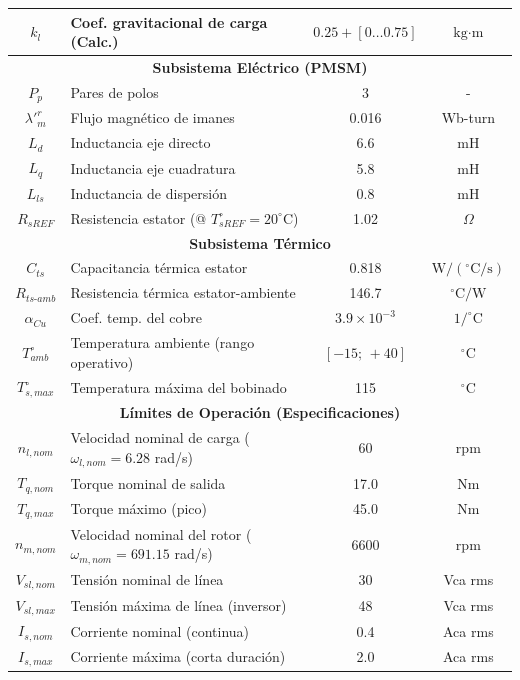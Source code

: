 \documentclass[12pt, a4paper,journal, onecolumn, compsoc]{IEEEtran}
\begin{document}
\begin{table}[htbp]
\begin{tabular}{|c|l|c|c|}
        $k_l$ & Coef. gravitacional de carga (Calc.) & $0.25 + [0\ldots0.75]$ & $\text{kg}\cdot\text{m}$ \\
        \hline
        \multicolumn{4}{|c|}{\textbf{Subsistema Eléctrico (PMSM)}} \\
        \hline
        $P_p$ & Pares de polos & 3 & - \\
        $\lambda'^r_m$ & Flujo magnético de imanes & 0.016 & Wb-turn \\
        $L_d$ & Inductancia eje directo & 6.6 & mH \\
        $L_q$ & Inductancia eje cuadratura & 5.8 & mH \\
        $L_{ls}$ & Inductancia de dispersión & 0.8 & mH \\
        $R_{sREF}$ & Resistencia estator (@ $T_{sREF}^\circ=20^\circ$C) & 1.02 & $\Omega$ \\
        \hline
        \multicolumn{4}{|c|}{\textbf{Subsistema Térmico}} \\
        \hline
        $C_{ts}$ & Capacitancia térmica estator & 0.818 & $\text{W}/(^\circ\text{C}/\text{s})$ \\
        $R_{ts\text{-}amb}$ & Resistencia térmica estator-ambiente & 146.7 & $^\circ\text{C}/\text{W}$ \\
        $\alpha_{Cu}$ & Coef. temp. del cobre & $3.9 \times 10^{-3}$ & $1/^\circ\text{C}$ \\
        $T_{amb}^\circ$ & Temperatura ambiente (rango operativo) & $[-15;\,+40]$ & $^\circ\text{C}$ \\
        $T^\circ_{s,max}$ & Temperatura máxima del bobinado & 115 & $^\circ\text{C}$ \\
        \hline
        \multicolumn{4}{|c|}{\textbf{Límites de Operación (Especificaciones)}} \\
        \hline
        $n_{l,nom}$ & Velocidad nominal de carga ($\omega_{l,nom}=6.28$ rad/s) & 60 & rpm \\
        $T_{q,nom}$ & Torque nominal de salida & 17.0 & Nm \\
        $T_{q,max}$ & Torque máximo (pico) & 45.0 & Nm \\
        $n_{m,nom}$ & Velocidad nominal del rotor ($\omega_{m,nom}=691.15$ rad/s) & 6600 & rpm \\
        $V_{sl,nom}$ & Tensión nominal de línea & 30 & Vca rms \\
        $V_{sl,max}$ & Tensión máxima de línea (inversor) & 48 & Vca rms \\
        $I_{s,nom}$ & Corriente nominal (continua) & 0.4 & Aca rms \\
        $I_{s,max}$ & Corriente máxima (corta duración) & 2.0 & Aca rms \\
        \hline
    \end{tabular}
    \label{tab:parametros}
\end{table}
\end{document}
